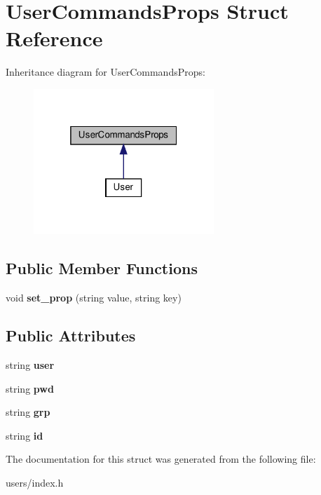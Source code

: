 \hypertarget{structUserCommandsProps}{}\section{User\+Commands\+Props Struct Reference}
\label{structUserCommandsProps}


Inheritance diagram for User\+Commands\+Props\+:\nopagebreak
\begin{figure}[H]
\begin{center}
\leavevmode
\includegraphics[width=193pt]{structUserCommandsProps__inherit__graph}
\end{center}
\end{figure}
\subsection*{Public Member Functions}
\begin{DoxyCompactItemize}
\item 
\mbox{\label{structUserCommandsProps_a4740b3e981ed7efa3acd981a47c98191}} 
void {\bfseries set\+\_\+prop} (string value, string key)
\end{DoxyCompactItemize}
\subsection*{Public Attributes}
\begin{DoxyCompactItemize}
\item 
\mbox{\label{structUserCommandsProps_a4dbe9ca2f3589e635ffb110c5a57268f}} 
string {\bfseries user}
\item 
\mbox{\label{structUserCommandsProps_a673b028f7b238168b76ff117e1630768}} 
string {\bfseries pwd}
\item 
\mbox{\label{structUserCommandsProps_a7dfa262b7f34e98fa0c57f4a9a739675}} 
string {\bfseries grp}
\item 
\mbox{\label{structUserCommandsProps_a4585588abc2524f941f500e44c6f241c}} 
string {\bfseries id}
\end{DoxyCompactItemize}


The documentation for this struct was generated from the following file\+:\begin{DoxyCompactItemize}
\item 
users/index.\+h\end{DoxyCompactItemize}
